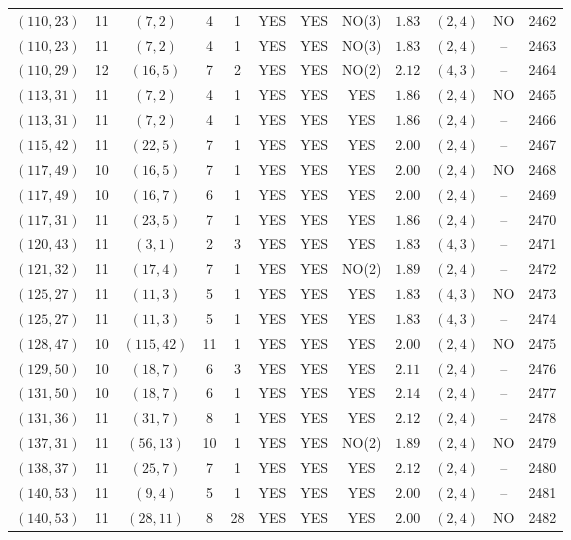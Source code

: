\begin{longtable}{|c|c|c|c|c|c|c|c|c|c|c|c|}
$(110,23)$ & 11 & $(7,2)$ & 4 & 1 & YES & YES & NO(3) & $1.83$ & $(2,4)$ & NO & 2462\\
$(110,23)$ & 11 & $(7,2)$ & 4 & 1 & YES & YES & NO(3) & $1.83$ & $(2,4)$ & -- & 2463\\
$(110,29)$ & 12 & $(16,5)$ & 7 & 2 & YES & YES & NO(2) & $2.12$ & $(4,3)$ & -- & 2464\\
$(113,31)$ & 11 & $(7,2)$ & 4 & 1 & YES & YES & YES & $1.86$ & $(2,4)$ & NO & 2465\\
$(113,31)$ & 11 & $(7,2)$ & 4 & 1 & YES & YES & YES & $1.86$ & $(2,4)$ & -- & 2466\\
$(115,42)$ & 11 & $(22,5)$ & 7 & 1 & YES & YES & YES & $2.00$ & $(2,4)$ & -- & 2467\\
$(117,49)$ & 10 & $(16,5)$ & 7 & 1 & YES & YES & YES & $2.00$ & $(2,4)$ & NO & 2468\\
$(117,49)$ & 10 & $(16,7)$ & 6 & 1 & YES & YES & YES & $2.00$ & $(2,4)$ & -- & 2469\\
$(117,31)$ & 11 & $(23,5)$ & 7 & 1 & YES & YES & YES & $1.86$ & $(2,4)$ & -- & 2470\\
$(120,43)$ & 11 & $(3,1)$ & 2 & 3 & YES & YES & YES & $1.83$ & $(4,3)$ & -- & 2471\\
$(121,32)$ & 11 & $(17,4)$ & 7 & 1 & YES & YES & NO(2) & $1.89$ & $(2,4)$ & -- & 2472\\
$(125,27)$ & 11 & $(11,3)$ & 5 & 1 & YES & YES & YES & $1.83$ & $(4,3)$ & NO & 2473\\
$(125,27)$ & 11 & $(11,3)$ & 5 & 1 & YES & YES & YES & $1.83$ & $(4,3)$ & -- & 2474\\
$(128,47)$ & 10 & $(115,42)$ & 11 & 1 & YES & YES & YES & $2.00$ & $(2,4)$ & NO & 2475\\
$(129,50)$ & 10 & $(18,7)$ & 6 & 3 & YES & YES & YES & $2.11$ & $(2,4)$ & -- & 2476\\
$(131,50)$ & 10 & $(18,7)$ & 6 & 1 & YES & YES & YES & $2.14$ & $(2,4)$ & -- & 2477\\
$(131,36)$ & 11 & $(31,7)$ & 8 & 1 & YES & YES & YES & $2.12$ & $(2,4)$ & -- & 2478\\
$(137,31)$ & 11 & $(56,13)$ & 10 & 1 & YES & YES & NO(2) & $1.89$ & $(2,4)$ & NO & 2479\\
$(138,37)$ & 11 & $(25,7)$ & 7 & 1 & YES & YES & YES & $2.12$ & $(2,4)$ & -- & 2480\\
$(140,53)$ & 11 & $(9,4)$ & 5 & 1 & YES & YES & YES & $2.00$ & $(2,4)$ & -- & 2481\\
$(140,53)$ & 11 & $(28,11)$ & 8 & 28 & YES & YES & YES & $2.00$ & $(2,4)$ & NO & 2482\\

\end{longtable}

